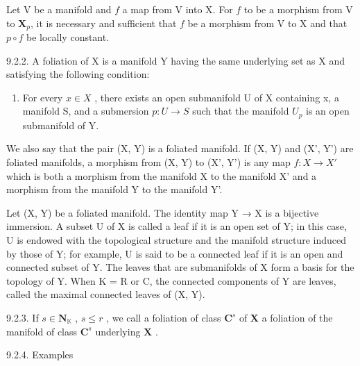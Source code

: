 Let V be a manifold and \(f\) a map from V into X. For \(f\) to be a morphism from V to \(\mathbf{X}_{p}\), it is necessary and sufficient that \(f\) be a morphism from V to X and that \(p \circ f\) be locally constant.

9.2.2. A foliation of X is a manifold Y having the same underlying set as X and satisfying the following condition:

\begin{enumerate}
\def\labelenumi{(\Alph{enumi})}
\setcounter{enumi}{5}
\tightlist
\item
  For every \(x \in X\) , there exists an open submanifold U of X containing x, a manifold S, and a submersion \(p: U \to S\) such that the manifold \(U_{p}\) is an open submanifold of Y.
\end{enumerate}

We also say that the pair (X, Y) is a foliated manifold. If (X, Y) and (X', Y') are foliated manifolds, a morphism from (X, Y) to (X', Y') is any map \(f: X \to X'\) which is both a morphism from the manifold X to the manifold X' and a morphism from the manifold Y to the manifold Y'.

Let (X, Y) be a foliated manifold. The identity map Y → X is a bijective immersion. A subset U of X is called a leaf if it is an open set of Y; in this case, U is endowed with the topological structure and the manifold structure induced by those of Y; for example, U is said to be a connected leaf if it is an open and connected subset of Y. The leaves that are submanifolds of X form a basis for the topology of Y. When K = R or C, the connected components of Y are leaves, called the maximal connected leaves of (X, Y).

9.2.3. If \(s \in \mathbf{N}_{\mathbb{K}}\) , \(s \leqslant r\) , we call a foliation of class \(\mathbf{C}^s\) of \(\mathbf{X}\) a foliation of the manifold of class \(\mathbf{C}^s\) underlying \(\mathbf{X}\) .

9.2.4. Examples

